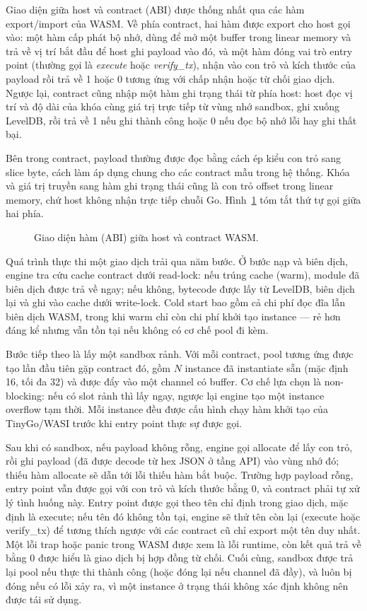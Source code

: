Giao diện giữa host và contract (ABI) được thống nhất qua các hàm export/import
của WASM. Về phía contract, hai hàm được export cho host gọi vào: một hàm cấp
phát bộ nhớ, dùng để mở một buffer trong linear memory và trả về vị trí bắt
đầu để host ghi payload vào đó, và một hàm đóng vai trò entry point (thường
gọi là \emph{execute} hoặc \emph{verify\_tx}), nhận vào con trỏ và kích thước
của payload rồi trả về 1 hoặc 0 tương ứng với chấp nhận hoặc từ chối giao
dịch. Ngược lại, contract cũng nhập một hàm ghi trạng thái từ phía host: host
đọc vị trí và độ dài của khóa cùng giá trị trực tiếp từ vùng nhớ sandbox, ghi
xuống LevelDB, rồi trả về 1 nếu ghi thành công hoặc 0 nếu đọc bộ nhớ lỗi hay
ghi thất bại.
 
Bên trong contract, payload thường được đọc bằng cách ép kiểu con trỏ sang
slice byte, cách làm áp dụng chung cho các contract mẫu trong hệ thống. Khóa
và giá trị truyền sang hàm ghi trạng thái cũng là con trỏ offset trong linear
memory, chứ host không nhận trực tiếp chuỗi Go. Hình~\ref{fig:wasm-abi} tóm
tắt thứ tự gọi giữa hai phía.

\begin{figure}[H]
\centering
\caption{Giao diện hàm (ABI) giữa host và contract WASM.}
\label{fig:wasm-abi}
\end{figure}

Quá trình thực thi một giao dịch trải qua năm bước. Ở bước nạp và biên dịch,
engine tra cứu cache contract dưới read-lock: nếu trúng cache (warm), module đã
biên dịch được trả về ngay; nếu không, bytecode được lấy từ LevelDB, biên dịch
lại và ghi vào cache dưới write-lock. Cold start bao gồm cả chi phí đọc đĩa lẫn
biên dịch WASM, trong khi warm chỉ còn chi phí khởi tạo instance --- rẻ hơn
đáng kể nhưng vẫn tồn tại nếu không có cơ chế pool đi kèm.

Bước tiếp theo là lấy một sandbox rảnh. Với mỗi contract, pool tương ứng được
tạo lần đầu tiên gặp contract đó, gồm $N$ instance đã instantiate sẵn (mặc định
16, tối đa 32) và được đẩy vào một channel có buffer. Cơ chế lựa chọn là
non-blocking: nếu có slot rảnh thì lấy ngay, ngược lại engine tạo một instance
overflow tạm thời. Mỗi instance đều được cấu hình chạy hàm khởi tạo của
TinyGo/WASI trước khi entry point thực sự được gọi.

Sau khi có sandbox, nếu payload không rỗng, engine gọi allocate để lấy
con trỏ, rồi ghi payload (đã được decode từ hex JSON ở tầng API) vào vùng nhớ
đó; thiếu hàm allocate sẽ dẫn tới lỗi thiếu hàm bắt buộc. Trường hợp
payload rỗng, entry point vẫn được gọi với con trỏ và kích thước bằng 0, và
contract phải tự xử lý tình huống này. Entry point được gọi theo tên chỉ định
trong giao dịch, mặc định là execute; nếu tên đó không tồn tại, engine
sẽ thử tên còn lại (execute hoặc verify\_tx) để tương thích
ngược với các contract cũ chỉ export một tên duy nhất. Một lỗi trap hoặc panic
trong WASM được xem là lỗi runtime, còn kết quả trả về bằng 0 được hiểu là
giao dịch bị hợp đồng từ chối. Cuối cùng, sandbox được trả lại pool nếu thực
thi thành công (hoặc đóng lại nếu channel đã đầy), và luôn bị đóng nếu có lỗi
xảy ra, vì một instance ở trạng thái không xác định không nên được tái sử dụng.

